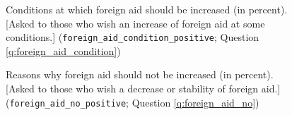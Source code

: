 \documentclass[12pt,english]{article}
\begin{document}
\begin{bibunit}
  \begin{figure}[h!]
    \cprotect\caption[Conditions at which foreign aid should be increased]{Conditions at which foreign aid should be increased (in percent). [Asked to those who wish an increase of foreign aid at some conditions.] (\verb|foreign_aid_condition_positive|; Question \ref{q:foreign_aid_condition})}\label{fig:foreign_aid_condition}
  \end{figure}
  
  \begin{figure}[h!]
    \cprotect\caption[Reasons why foreign aid should not be increased]{Reasons why foreign aid should not be increased (in percent). [Asked to those who wish a decrease or stability of foreign aid.] (\verb|foreign_aid_no_positive|; Question \ref{q:foreign_aid_no})}\label{fig:foreign_aid_no}
  \end{figure}

\appendix 
\renewcommand{\thetable}{S\arabic{table}}
\renewcommand{\thefigure}{S\arabic{figure}}
\setcounter{figure}{0}
\setcounter{table}{0}


 

\renewcommand{\url}[1]{\href{#1}{Link}} 
\putbib
\end{bibunit}

\listoftables
\listoffigures
\end{document}
